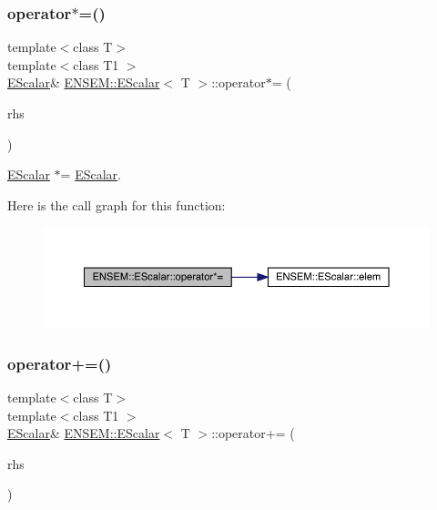 \subsubsection{\texorpdfstring{operator$\ast$=()}{operator*=()}\hspace{0.1cm}{\footnotesize\ttfamily [3/3]}}
{\footnotesize\ttfamily template$<$class T$>$ \\
template$<$class T1 $>$ \\
\mbox{\hyperlink{classENSEM_1_1EScalar}{E\+Scalar}}\& \mbox{\hyperlink{classENSEM_1_1EScalar}{E\+N\+S\+E\+M\+::\+E\+Scalar}}$<$ T $>$\+::operator$\ast$= (\begin{DoxyParamCaption}\item[{const \mbox{\hyperlink{classENSEM_1_1EScalar}{E\+Scalar}}$<$ T1 $>$ \&}]{rhs }\end{DoxyParamCaption})\hspace{0.3cm}{\ttfamily [inline]}}



\mbox{\hyperlink{classENSEM_1_1EScalar}{E\+Scalar}} $\ast$= \mbox{\hyperlink{classENSEM_1_1EScalar}{E\+Scalar}}. 

Here is the call graph for this function\+:
\nopagebreak
\begin{figure}[H]
\begin{center}
\leavevmode
\includegraphics[width=350pt]{d0/d82/classENSEM_1_1EScalar_aa614bef8258a8ea3c2711c4d7d032c1a_cgraph}
\end{center}
\end{figure}
\mbox{\label{classENSEM_1_1EScalar_aa34f8bd686adb144a6d0e5e8f69787ce}} 
\subsubsection{\texorpdfstring{operator+=()}{operator+=()}\hspace{0.1cm}{\footnotesize\ttfamily [1/3]}}
{\footnotesize\ttfamily template$<$class T$>$ \\
template$<$class T1 $>$ \\
\mbox{\hyperlink{classENSEM_1_1EScalar}{E\+Scalar}}\& \mbox{\hyperlink{classENSEM_1_1EScalar}{E\+N\+S\+E\+M\+::\+E\+Scalar}}$<$ T $>$\+::operator+= (\begin{DoxyParamCaption}\item[{const \mbox{\hyperlink{classENSEM_1_1EScalar}{E\+Scalar}}$<$ T1 $>$ \&}]{rhs }\end{DoxyParamCaption})\hspace{0.3cm}{\ttfamily [inline]}}



